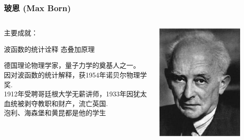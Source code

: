 \begin{frame}
    \frametitle{玻恩 (Max Born)}
        \begin{columns}
            \begin{column}[t]{0.46\linewidth}
                主要成就：
                \begin{enumerate}
                    \Item 波函数的统计诠释
                    \Item 态叠加原理
                \end{enumerate}
                德国理论物理学家，量子力学的奠基人之一。\\
                因对波函数的统计解释，获1954年诺贝尔物理学奖.\\
                1912年受聘哥廷根大学无薪讲师，1933年因犹太血统被剥夺教职和财产，流亡英国.\\ \vspace{0.3em}
                泡利、海森堡和黄昆都是他的学生
            \end{column}
            \begin{column}[t]{0.46\linewidth}
                \begin{center}
                    \includegraphics[width=0.9\textwidth]{figs/Born.png} \\
                \end{center} 
            \end{column}           
        \end{columns}
\end{frame}

